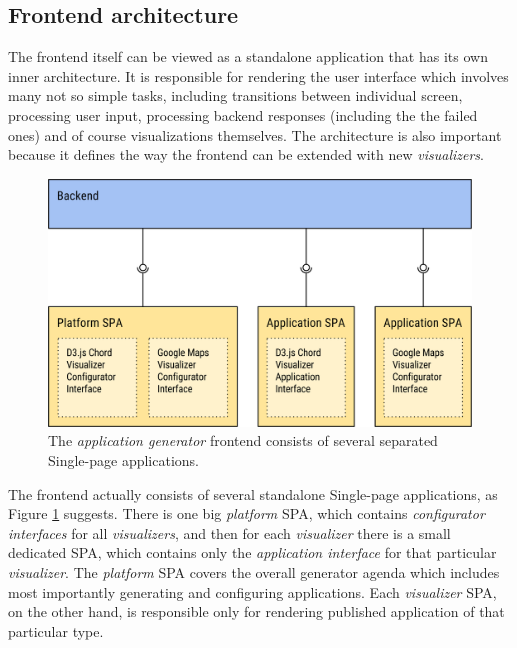 \subsection{Frontend architecture}
\label{sec:system-proposal:architecture-analysis:frontend-architecture}

The frontend itself can be viewed as a standalone application that has its own inner architecture. It is responsible for rendering the user interface which involves many not so simple tasks, including transitions between individual screen, processing user input, processing backend responses (including the the failed ones) and of course visualizations themselves. The architecture is also important because it defines the way the frontend can be extended with new \emph{visualizers}. 
\begin{figure}
	\centering
	\includegraphics[width=140mm]{img/04_frontend_base_structure_spas.png}
	\caption{The \emph{application generator} frontend consists of several separated Single-page applications.} 
	\label{fig:frontend-base-structure-spas}
\end{figure}

The frontend actually consists of several standalone Single-page applications, as Figure \ref{fig:frontend-base-structure-spas} suggests. There is one big \emph{platform} SPA, which contains \emph{configurator interfaces} for all \emph{visualizers}, and then for each \emph{visualizer} there is a small dedicated SPA, which contains only the \emph{application interface} for that particular \emph{visualizer}. The \emph{platform} SPA covers the overall generator agenda which includes most importantly generating and configuring applications. Each \emph{visualizer} SPA, on the other hand, is responsible only for rendering published application of that particular type. 

